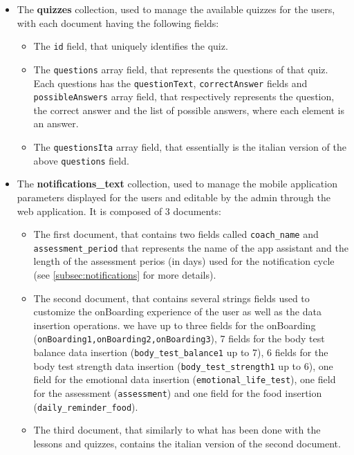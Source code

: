 \begin{itemize}[nosep] %
    \item The \textbf{quizzes} collection, used to manage the available quizzes for the users, with each document having the following fields:
    \begin{itemize}[nosep]
        \item The \texttt{id} field, that uniquely identifies the quiz.
        \item The \texttt{questions} array field, that represents the questions of that quiz. Each questions has the \texttt{questionText}, \texttt{correctAnswer} fields and \texttt{possibleAnswers} array field, that respectively represents the question, the correct answer and the list of possible answers, where each element is an answer.
        \item The \texttt{questionsIta} array field, that essentially is the italian version of the above \texttt{questions} field.
    \end{itemize}
\end{itemize}
\newpage
\begin{itemize}[nosep] %
    \item The \textbf{notifications\_text} collection, used to manage the mobile application parameters displayed for the users and editable by the admin through the web application. It is composed of 3 documents:
    \begin{itemize}[nosep]
        \item The first document, that contains two fields called \texttt{coach\_name} and \newline \texttt{assessment\_period} that represents the name of the app assistant and the length of the assessment perios (in days) used for the notification cycle (see \cref{subsec:notifications} for more details).
        \item The second document, that contains several strings fields used to customize the onBoarding experience of the user as well as the data insertion operations. we have up to three fields for the onBoarding (\texttt{onBoarding1,onBoarding2,onBoarding3}), 7 fields for the body test balance data insertion (\texttt{body\_test\_balance1} up to 7), 6 fields for the body test strength data insertion (\texttt{body\_test\_strength1} up to 6), one field for the emotional data insertion (\texttt{emotional\_life\_test}), one field for the assessment (\texttt{assessment}) and one field for the food insertion (\texttt{daily\_reminder\_food}).
        \item The third document, that similarly to what has been done with the lessons and quizzes, contains the italian version of the second document.
    \end{itemize}
\end{itemize}

